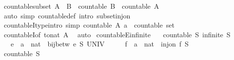 \begin{isabellebody}
\endisatagproof
{\isafoldproof}%
%
\isadelimproof
\isanewline
%
\endisadelimproof
\isanewline
{}\isamarkupfalse%
\ countable{\isacharunderscore}subset{\isacharcolon}\ {\isachardoublequoteopen}A\ {\isasymsubseteq}\ B\ {\isasymLongrightarrow}\ countable\ B\ {\isasymLongrightarrow}\ countable\ A{\isachardoublequoteclose}\isanewline
%
\isadelimproof
\ \ %
\endisadelimproof
%
\isatagproof
{}\isamarkupfalse%
\ {\isacharparenleft}auto\ simp{\isacharcolon}\ countable{\isacharunderscore}def\ intro{\isacharcolon}\ subset{\isacharunderscore}inj{\isacharunderscore}on{\isacharparenright}%
\endisatagproof
{\isafoldproof}%
%
\isadelimproof
\isanewline
%
\endisadelimproof
\isanewline
{}\isamarkupfalse%
\ countableI{\isacharunderscore}type{\isacharbrackleft}intro{\isacharcomma}\ simp{\isacharbrackright}{\isacharcolon}\ {\isachardoublequoteopen}countable\ {\isacharparenleft}A{\isacharcolon}{\isacharcolon}\ {\isacharprime}a\ {\isacharcolon}{\isacharcolon}\ countable\ set{\isacharparenright}{\isachardoublequoteclose}\isanewline
%
\isadelimproof
\ \ %
\endisadelimproof
%
\isatagproof
{}\isamarkupfalse%
\ countableI{\isacharbrackleft}of\ to{\isacharunderscore}nat\ A{\isacharbrackright}\ \isamarkupfalse%
\ auto%
\endisatagproof
{\isafoldproof}%
%
\isadelimproof
%
\endisadelimproof
%
\isadelimdocument
%
\endisadelimdocument
%
\isatagdocument
%
\isamarkuptrue%
%
\endisatagdocument
{\isafolddocument}%
%
\isadelimdocument
%
\endisadelimdocument
{}\isamarkupfalse%
\ countableE{\isacharunderscore}infinite{\isacharcolon}\isanewline
\ \ \ {\isachardoublequoteopen}countable\ S{\isachardoublequoteclose}\ {\isachardoublequoteopen}infinite\ S{\isachardoublequoteclose}\isanewline
\ \ \ e\ {\isacharcolon}{\isacharcolon}\ {\isachardoublequoteopen}{\isacharprime}a\ {\isasymRightarrow}\ nat{\isachardoublequoteclose}\ \ {\isachardoublequoteopen}bij{\isacharunderscore}betw\ e\ S\ UNIV{\isachardoublequoteclose}\isanewline
%
\isadelimproof
%
\endisadelimproof
%
\isatagproof
{}\isamarkupfalse%
\ {\isacharminus}\isanewline
\ \ \isamarkupfalse%
\ f\ {\isacharcolon}{\isacharcolon}\ {\isachardoublequoteopen}{\isacharprime}a\ {\isasymRightarrow}\ nat{\isachardoublequoteclose}\ \ {\isachardoublequoteopen}inj{\isacharunderscore}on\ f\ S{\isachardoublequoteclose}\isanewline
\ \ \ \ \isamarkupfalse%
\ {\isacartoucheopen}countable\ S{\isacartoucheclose}\ \isamarkupfalse%

\end{isabellebody}

